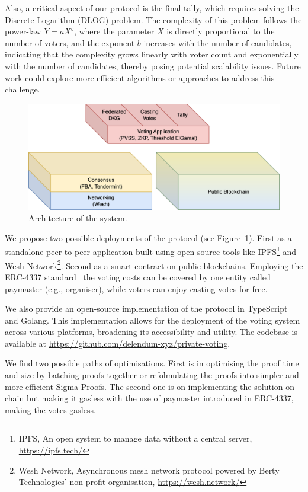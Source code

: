 \documentclass[runningheads]{llncs}
\begin{document}
Also, a critical aspect of our protocol is the final tally, which requires solving the Discrete Logarithm (DLOG) problem. The complexity of this problem follows the power-law \( Y = aX^b \), where the parameter \( X \) is directly proportional to the number of voters, and the exponent \( b \) increases with the number of candidates, indicating that the complexity grows linearly with voter count and exponentially with the number of candidates, thereby posing potential scalability issues. Future work could explore more efficient algorithms or approaches to address this challenge.

\begin{figure}[H]
    \centering
    \includegraphics[width=\textwidth]{stack-bc.png}
    \caption{Architecture of the system.}
    \label{fig:stack-bc}
\end{figure}

We propose two possible deployments of the protocol (see Figure~\ref{fig:stack-bc}). First as a standalone peer-to-peer application built using open-source tools like IPFS\footnote{IPFS, An open system to manage data without a central server, \url{https://ipfs.tech/}} and Wesh Network\footnote{Wesh Network, Asynchronous mesh network protocol powered by Berty Technologies’ non-profit organisation, \url{https://wesh.network/}}. Second as a smart-contract on public blockchains. Employing the ERC-4337 standard~\cite{ERC4337AccountAbstraction} the voting costs can be covered by one entity called paymaster (e.g., organiser), while voters can enjoy casting votes for free.

We also provide an open-source implementation of the protocol in TypeScript and Golang. This implementation allows for the deployment of the voting system across various platforms, broadening its accessibility and utility. The codebase is available at \url{https://github.com/delendum-xyz/private-voting}.

We find two possible paths of optimisations. First is in optimising the proof time and size by batching proofs together or refolmulating the proofs into simpler and more efficient Sigma Proofs. 
The second one is on implementing the solution on-chain but making it gasless with the use of paymaster introduced in ERC-4337, making the votes gasless.
\end{document}
